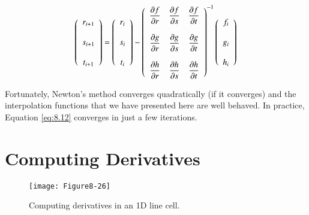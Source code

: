 \begin{equation}\label{eq:8.12}
\left(
\begin{array}{c}
r_{i + 1} \\ \\
s_{i + 1} \\ \\
t_{i + 1}
\end{array}
\right) = \left(
\begin{array}{c}
r_i \\ \\
s_i \\ \\
t_i
\end{array}
\right) - \left(
\begin{array}{c c c}
\dfrac{\partial f}{\partial r} & \dfrac{\partial f}{\partial s} & \dfrac{\partial f}{\partial t} \\ \\
\dfrac{\partial g}{\partial r} & \dfrac{\partial g}{\partial s} & \dfrac{\partial g}{\partial t} \\ \\
\dfrac{\partial h}{\partial r} & \dfrac{\partial h}{\partial s} & \dfrac{\partial h}{\partial t}
\end{array}
\right)^{-1}
\left(
\begin{array}{c}
f_i \\ \\
g_i \\ \\
h_i
\end{array}
\right)
\end{equation}

Fortunately, Newton's method converges quadratically (if it converges) and the interpolation functions that we have presented here are well behaved. In practice, Equation \ref{eq:8.12} converges in just a few iterations.

\section{Computing Derivatives}

\begin{figure}[!htb]
    \centering
    \texttt{[image: Figure8-26]}\\
    \caption{Computing derivatives in an 1D line cell.}\label{fig:Figure8-26}
\end{figure}

